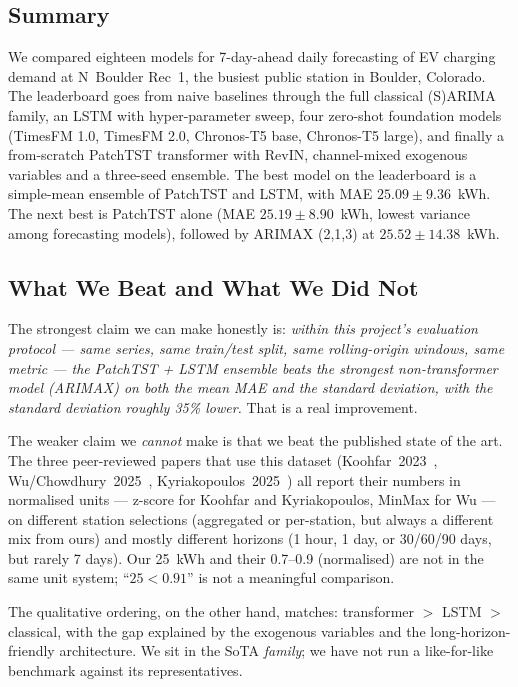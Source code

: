 \subsection{Summary}

We compared eighteen models for 7-day-ahead daily forecasting of EV
charging demand at N~Boulder Rec~1, the busiest public station in
Boulder, Colorado. The leaderboard goes from naive baselines through
the full classical (S)ARIMA family, an LSTM with hyper-parameter
sweep, four zero-shot foundation models (TimesFM 1.0, TimesFM 2.0,
Chronos-T5 base, Chronos-T5 large), and finally a from-scratch
PatchTST transformer with RevIN, channel-mixed exogenous variables
and a three-seed ensemble. The best model on the leaderboard is a
simple-mean ensemble of PatchTST and LSTM, with MAE
$25.09 \pm 9.36$~kWh. The next best is PatchTST alone (MAE
$25.19 \pm 8.90$~kWh, lowest variance among forecasting models),
followed by ARIMAX (2,1,3) at $25.52 \pm 14.38$~kWh.

\subsection{What We Beat and What We Did Not}

The strongest claim we can make honestly is: \emph{within this
project's evaluation protocol --- same series, same train/test split,
same rolling-origin windows, same metric --- the PatchTST + LSTM
ensemble beats the strongest non-transformer model (ARIMAX) on both
the mean MAE and the standard deviation, with the standard deviation
roughly 35\% lower.} That is a real improvement.

The weaker claim we \emph{cannot} make is that we beat the published
state of the art. The three peer-reviewed papers that use this dataset
(Koohfar~2023~\cite{koohfar2023transformer},
Wu/Chowdhury~2025~\cite{wu2025catformer},
Kyriakopoulos~2025~\cite{kyriakopoulos2025comparative}) all report
their numbers in normalised units --- z-score for Koohfar and
Kyriakopoulos, MinMax for Wu --- on different station selections
(aggregated or per-station, but always a different mix from ours) and
mostly different horizons (1 hour, 1 day, or 30/60/90 days, but rarely
7 days). Our 25~kWh and their 0.7--0.9 (normalised) are not in the
same unit system; ``$25 < 0.91$'' is not a meaningful comparison.

The qualitative ordering, on the other hand, matches: transformer
$>$ LSTM $>$ classical, with the gap explained by the exogenous
variables and the long-horizon-friendly architecture. We sit in the
SoTA \emph{family}; we have not run a like-for-like benchmark against
its representatives.

